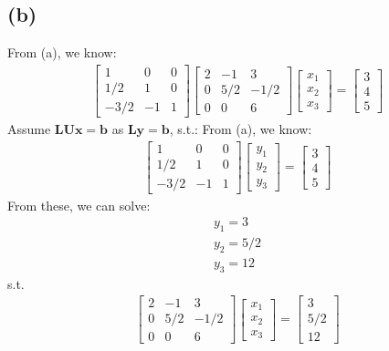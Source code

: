 \documentclass{article}
\begin{document}
\subsection*{(b)}
From (a), we know:
\begin{align*}
    \begin{bmatrix}
        1 & 0  &0 \\
        1/2 & 1& 0 \\
        -3/2 &-1 &1 
    \end{bmatrix} 
    \begin{bmatrix}
        2 &-1 &3 \\
        0 & 5/2& -1/2 \\
        0 & 0 &6 
    \end{bmatrix}
    \begin{bmatrix}
        x_1\\
        x_2\\
        x_3
    \end{bmatrix} = 
    \begin{bmatrix}
        3 \\
        4 \\
        5 
    \end{bmatrix}
\end{align*}
Assume \(\bm{L}\bm{U}\bm{x} = \bm{b}\) as \(\bm{L}\bm{y} = \bm{b}\), s.t.:
From (a), we know:
\begin{align*}
    \begin{bmatrix}
        1 & 0  &0 \\
        1/2 & 1& 0 \\
        -3/2 &-1 &1 
    \end{bmatrix} 
    \begin{bmatrix}
        y_1\\
        y_2\\
        y_3
    \end{bmatrix} = 
    \begin{bmatrix}
        3 \\
        4 \\
        5 
    \end{bmatrix}
\end{align*}
From these, we can solve:
\begin{align*}
    y_1 = 3 \\
    y_2 = 5/2 \\
    y_3 = 12 
\end{align*}
s.t.
\begin{align*}
    \begin{bmatrix}
        2 &-1 &3 \\
        0 & 5/2& -1/2 \\
        0 & 0 &6 
    \end{bmatrix}
    \begin{bmatrix}
        x_1\\
        x_2\\
        x_3
    \end{bmatrix} = 
    \begin{bmatrix}
    3 \\
    5/2 \\
    12 
    \end{bmatrix}
\end{align*}
\end{document}
